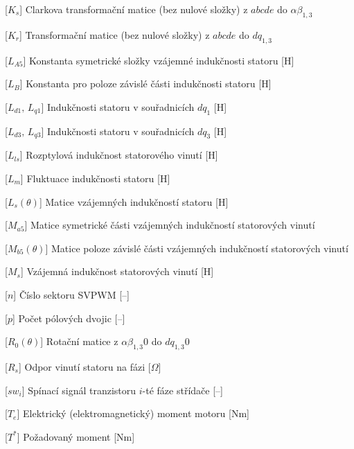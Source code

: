 \begin{acronym}[DSP48E1]
    [\ensuremath{K_s}]
    {Clarkova transformační matice (bez nulové složky) z $abcde$ do $\alpha\beta_{1,3}$}

    [\ensuremath{K_r}]
    {Transformační matice (bez nulové složky) z $abcde$ do $dq_{1,3}$}

    [\ensuremath{L_{A5}}]
    {Konstanta symetrické složky vzájemné indukčnosti statoru \hfill [H]}

    [\ensuremath{L_{B}}]
    {Konstanta pro poloze závislé části indukčnosti statoru \hfill [H]}

    [\ensuremath{L_{d1},\,L_{q1}}]
    {Indukčnosti statoru v souřadnicích $dq_1$ \hfill [H]}

    [\ensuremath{L_{d3},\,L_{q3}}]
    {Indukčnosti statoru v souřadnicích $dq_3$ \hfill [H]}

    [\ensuremath{L_{ls}}]
    {Rozptylová indukčnost statorového vinutí \hfill [H]}

    [\ensuremath{L_m}]
    {Fluktuace indukčnosti statoru \hfill [H]}

    [\ensuremath{L_s(\theta)}]
    {Matice vzájemných indukčností statoru \hfill [H]}

    [\ensuremath{M_{a5}}]
    {Matice symetrické části vzájemných indukčností statorových vinutí}

    [\ensuremath{M_{b5}(\theta)}]
    {Matice poloze závislé části vzájemných indukčností statorových vinutí}

    [\ensuremath{M_s}]
    {Vzájemná indukčnost statorových vinutí \hfill [H]}

    [\ensuremath{n}]
    {Číslo sektoru SVPWM \hfill [--]}

    [\ensuremath{p}]
    {Počet pólových dvojic \hfill [--]}

    [\ensuremath{R_0(\theta)}]
    {Rotační matice z $\alpha\beta_{1,3}0$ do $dq_{1,3}0$}

    [\ensuremath{R_s}]
    {Odpor vinutí statoru na fázi \hfill [$\Omega$]}

    [\ensuremath{sw_i}]
    {Spínací signál tranzistoru $i$-té fáze střídače \hfill [--]}

    [\ensuremath{T_e}]
    {Elektrický (elektromagnetický) moment motoru \hfill [Nm]}

    [\ensuremath{T^*}]
    {Požadovaný moment \hfill [Nm]}


\end{acronym}
